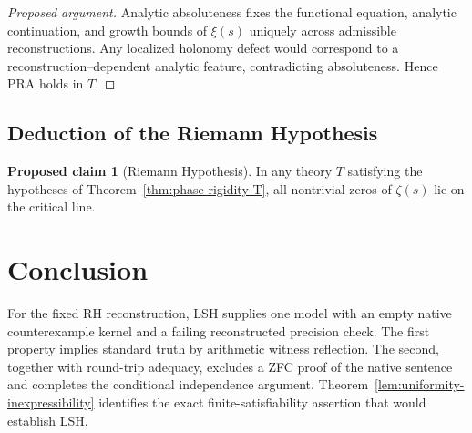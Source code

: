 \documentclass{article}
\theoremstyle{definition}
\newtheorem{proposal}[theorem]{Proposed claim}
\begin{document}
\begin{proof}[Proposed argument]
Analytic absoluteness fixes the functional equation, analytic continuation,
and growth bounds of $\xi(s)$ uniquely across admissible reconstructions.
Any localized holonomy defect would correspond to a reconstruction--dependent
analytic feature, contradicting absoluteness. Hence PRA holds in $T$.
\end{proof}

\subsection{Deduction of the Riemann Hypothesis}

\begin{proposal}[Riemann Hypothesis]
\label{cor:RH-from-phase}
In any theory $T$ satisfying the hypotheses of
Theorem~\ref{thm:phase-rigidity-T}, all nontrivial zeros of $\zeta(s)$
lie on the critical line.
\end{proposal}



\section*{Conclusion}
For the fixed RH reconstruction, LSH supplies one model with an empty
native counterexample kernel and a failing reconstructed precision check.
The first property implies standard truth by arithmetic witness reflection.
The second, together with round-trip adequacy, excludes a ZFC proof of
the native sentence and completes the conditional independence argument.
Theorem~\ref{lem:uniformity-inexpressibility} identifies the exact
finite-satisfiability assertion that would establish LSH.
\end{document}
